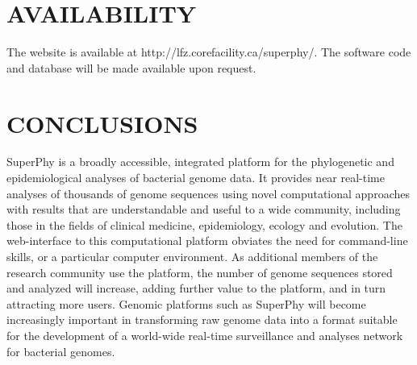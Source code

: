 \documentclass[a4paper,twoside]{article}
\begin{document}
\section{\uppercase{Availability}}
\label{sec:availability}

The website is available at http://lfz.corefacility.ca/superphy/. The software code and database will be made available upon request.

\section{\uppercase{Conclusions}}
\label{sec:conclusion}

\noindent SuperPhy is a broadly accessible, integrated platform for the phylogenetic and epidemiological analyses of bacterial genome data. It provides near real-time analyses of thousands of genome sequences using novel computational approaches with results that are understandable and useful to a wide community, including those in the fields of clinical medicine, epidemiology, ecology and evolution. The web-interface to this computational platform obviates the need for command-line skills, or a particular computer environment. As additional members of the research community use the platform, the number of genome sequences stored and analyzed will increase, adding further value to the platform, and in turn attracting more users. Genomic platforms such as SuperPhy will become increasingly important in transforming raw genome data into a format suitable for the development of a world-wide real-time surveillance and analyses network for bacterial genomes.

\vfill

{\small
}

\vfill
\end{document}
